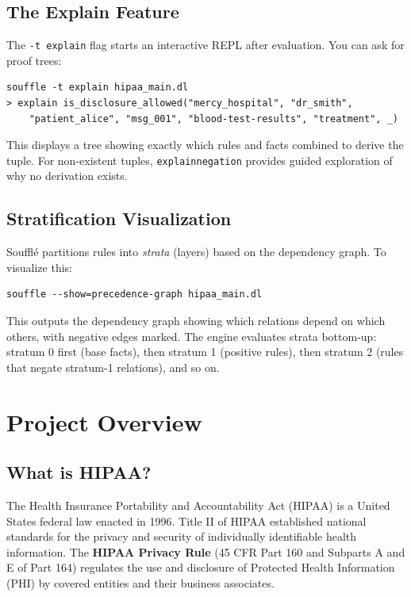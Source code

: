 \documentclass[11pt,letterpaper]{article}
\begin{document}
\subsection{The Explain Feature}
\label{sec:explain}

The \texttt{-t explain} flag starts an interactive REPL after evaluation. You can ask for proof trees:

\begin{lstlisting}[style=bashstyle]
souffle -t explain hipaa_main.dl
> explain is_disclosure_allowed("mercy_hospital", "dr_smith",
    "patient_alice", "msg_001", "blood-test-results", "treatment", _)
\end{lstlisting}

This displays a tree showing exactly which rules and facts combined to derive the tuple. For non-existent tuples, \texttt{explainnegation} provides guided exploration of why no derivation exists.

\subsection{Stratification Visualization}

Souffl\'{e} partitions rules into \emph{strata} (layers) based on the dependency graph. To visualize this:

\begin{lstlisting}[style=bashstyle]
souffle --show=precedence-graph hipaa_main.dl
\end{lstlisting}

This outputs the dependency graph showing which relations depend on which others, with negative edges marked. The engine evaluates strata bottom-up: stratum 0 first (base facts), then stratum 1 (positive rules), then stratum 2 (rules that negate stratum-1 relations), and so on.


\section{Project Overview}
\label{sec:project-overview}

\subsection{What is HIPAA?}

The Health Insurance Portability and Accountability Act (HIPAA) is a United States federal law enacted in 1996. Title II of HIPAA established national standards for the privacy and security of individually identifiable health information. The \textbf{HIPAA Privacy Rule} (45 CFR Part 160 and Subparts A and E of Part 164) regulates the use and disclosure of Protected Health Information (PHI) by covered entities and their business associates.
\end{document}
